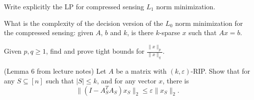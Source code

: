 \documentclass[12pt]{uebung}
\begin{document}
 

\newcommand{\bigo}{\mathcal{O}}
\renewcommand{\aufgname}{Exercise}

\begin{aufg}
Write explicitly the LP for compressed sensing $L_1$ norm minimization.
\end{aufg}

\begin{aufg}[2 pts.]
What is the complexity of the decision version of the $L_0$ norm minimization for the compressed sensing: given $A$, $b$ and $k$, is there $k$-sparse $x$ such that $Ax = b$.
\end{aufg}

\begin{aufg}
Given $p,q \ge 1$, find and prove tight bounds for $\frac{\|x\|_p}{\|x\|_q}$.
\end{aufg}

\begin{aufg}
(Lemma 6 from lecture notes)
Let $A$ be a matrix with $(k,\varepsilon)$-RIP. Show that for any $S \subseteq [n]$ such that $|S| \le k$, and for any vector $x$, there is
$$\|(I - A_S^T A_S)x_S\|_2 \le \varepsilon \|x_S\|_2.$$
\end{aufg}
\end{document}

